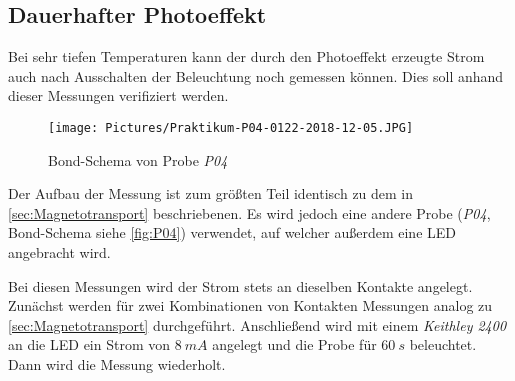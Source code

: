 \clearpage

\subsection{Dauerhafter Photoeffekt}\label{sec:Photoeffekt}
Bei sehr tiefen Temperaturen kann der durch den Photoeffekt erzeugte Strom auch nach Ausschalten der Beleuchtung noch gemessen können.
Dies soll anhand dieser Messungen verifiziert werden.

\begin{wrapfigure}[13]{r}{7cm}
\texttt{[image: Pictures/Praktikum-P04-0122-2018-12-05.JPG]}
\caption{Bond-Schema von Probe \emph{P04}}
\label{fig:P04}
\end{wrapfigure}


Der Aufbau der Messung ist zum größten Teil identisch zu dem in \autoref{sec:Magnetotransport} beschriebenen. Es wird jedoch eine andere Probe (\emph{P04}, Bond-Schema siehe \autoref{fig:P04}) verwendet, auf welcher außerdem eine LED angebracht wird.

Bei diesen Messungen wird der Strom stets an dieselben Kontakte angelegt.
Zunächst werden für zwei Kombinationen von Kontakten Messungen analog zu \autoref{sec:Magnetotransport} durchgeführt.
Anschließend wird mit einem \emph{Keithley 2400} an die LED ein Strom von $8\ \si{mA}$ angelegt und die Probe für $60\ \si{s}$ beleuchtet.
Dann wird die Messung wiederholt.
